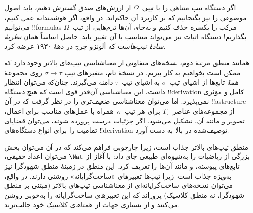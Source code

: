\documentclass[../../../include/open-logic-section]{subfiles}
\begin{document}
اگر دستگاه تیپ متناهی را با تیپی~$\Omega$ از ارزش‌های صدق گسترش دهیم،
باید اصول موضوعی را نیز بگنجانیم که بر کاربرد آن حاکم‌اند. در واقع، اگر
هوشمندانه عمل کنیم، می‌توانیم !!{formula}s مرکب را یکسره حذف کنیم و
به‌جای آن‌ها ترم‌هایی از تیپ~$\Omega$ بگذاریم!{} دستگاه اثبات نیز می‌تواند
متناسب با آن تغییر یابد. حاصل اساساً همان \emph{نظریهٔ سادهٔ تیپ‌ها}ست
که آلونزو چرچ در دههٔ ۱۹۳۰ عرضه کرد.

همانند منطق مرتبهٔ دوم، نسخه‌های متفاوتی از معناشناسی تیپ‌های بالاتر
وجود دارد که ممکن است بخواهیم به کار ببریم. در نسخهٔ تام، متغیرهای تیپ
$\sigma \to \tau$ روی مجموعهٔ \emph{همهٔ} تابع‌ها از اشیای تیپ~$\sigma$
به اشیای تیپ~$\tau$ دامنه می‌گیرند. چنان‌که می‌توان انتظار داشت، این
معناشناسی آن‌قدر قوی است که هیچ دستگاه !!{derivation} کامل و مؤثری
نمی‌پذیرد. اما می‌توان معناشناسی ضعیف‌تری را در نظر گرفت که در آن
!!a{structure} از مجموعه‌های عناصر~$T_\tau$ برای هر تیپ~$\tau$، همراه
با عمل‌های مناسب برای اعمال، تصویر و مانند آن، تشکیل می‌شود. اگر
جزئیات درست پرورده شوند، می‌توان قضایای تمامیت را برای انواع دستگاه‌های
!!{derivation} توصیف‌شده در بالا به دست آورد.

منطق تیپ‌های بالاتر جذاب است، زیرا چارچوبی فراهم می‌کند که در آن
می‌توان بخش بزرگی از ریاضیات را به‌شیوه‌ای طبیعی جای داد: با آغاز از
$\Nat$ می‌توان اعداد حقیقی، تابع‌های پیوسته، و مانند آن‌ها را تعریف
کرد. این منطق در زمینهٔ منطق شهودگرا نیز به‌ویژه جذاب است، زیرا تیپ‌ها
تعبیرهای «ساخت‌گرایانه» روشنی دارند. در واقع، می‌توان نسخه‌های
ساخت‌گرایانه‌ای از معناشناسی تیپ‌های بالاتر (مبتنی بر منطق شهودگرا، نه
منطق کلاسیک) پروراند که این تعبیرهای ساخت‌گرایانه را به‌خوبی روشن
می‌کنند و از بسیاری جهات از همتاهای کلاسیک خود جالب‌ترند.
\end{document}
